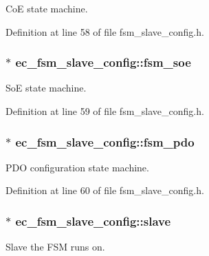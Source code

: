\-Co\-E state machine. 



\-Definition at line 58 of file fsm\-\_\-slave\-\_\-config.\-h.

\subsubsection[{fsm\-\_\-soe}]{$\ast$ {\bf ec\-\_\-fsm\-\_\-slave\-\_\-config\-::fsm\-\_\-soe}}\label{structec__fsm__slave__config_a5760deffedeccf9457cd5bbf9c8b1706}


\-So\-E state machine. 



\-Definition at line 59 of file fsm\-\_\-slave\-\_\-config.\-h.

\subsubsection[{fsm\-\_\-pdo}]{$\ast$ {\bf ec\-\_\-fsm\-\_\-slave\-\_\-config\-::fsm\-\_\-pdo}}\label{structec__fsm__slave__config_afad3c621c1ca68bcdb3b983cfa1101c0}


\-P\-D\-O configuration state machine. 



\-Definition at line 60 of file fsm\-\_\-slave\-\_\-config.\-h.

\subsubsection[{slave}]{$\ast$ {\bf ec\-\_\-fsm\-\_\-slave\-\_\-config\-::slave}}\label{structec__fsm__slave__config_aa4f0d106474cbddf8159b09049d14398}


\-Slave the \-F\-S\-M runs on. 



